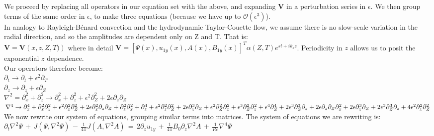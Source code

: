 \documentclass[letterpaper,12pt]{article}
\newcommand\reye{\mathrel{Re}}
\begin{document}
We proceed by replacing all operators in our equation set with the above, and expanding $\mathbf{V}$ in a perturbation series in $\epsilon$. We then group terms of the same order in $\epsilon$, to make three equations (because we have up to $\mathcal{O}(\epsilon^3)$). \\

In analogy to Rayleigh-B\'enard convection and the hydrodynamic Taylor-Couette flow, we assume there is no slow-scale variation in the radial direction, and so the amplitudes are dependent only on Z and T. That is: \\

$\mathbf{V} = \mathbf{V}\left(x, z, Z, T)\right)$ where in detail $\mathbf{V} = \left[\Psi(x), u_{1y}(x), A(x), B_{1y}(x)\right]^T \alpha\left(Z, T\right) e^{st + ik_z z}$. Periodicity in $z$ allows us to posit the exponential $z$ dependence. \\

Our operators therefore become: \\

$\partial_t \to \partial_t + \epsilon^2 \partial_T$ \\

$\partial_z \to \partial_z + \epsilon \partial_Z$ \\

$\nabla^2 = \partial_x^2 + \partial_z^2 \to \partial_x^2  + \partial_z^2 + \epsilon^2 \partial_Z^2 + 2\epsilon\partial_z\partial_Z$ \\

$\nabla^4 \to \partial_x^4 + \partial_x^2\partial_z^2 + \epsilon^2\partial_x^2\partial_Z^2 + 2\epsilon \partial_x^2 \partial_z \partial_Z \\
 + \partial_z^2\partial_x^2 + \partial_z^4 + \epsilon^2\partial_z^2\partial_Z^2 + 2\epsilon\partial_z^3\partial_Z \\
+ \epsilon^2\partial_Z^2\partial_x^2 + \epsilon^3\partial_Z^2\partial_z^2 + \epsilon^4\partial_Z^4 + 2\epsilon^3\partial_Z^3\partial_z \\
+ 2\epsilon\partial_z\partial_Z\partial_x^2 + 2\epsilon\partial_z^3\partial_Z + 2\epsilon^3\partial_Z^3\partial_z + 4\epsilon^2 \partial_z^2 \partial_Z^2$ \\

We now rewrite our system of equations, grouping similar terms into matrices. The system of equations we are rewriting is: \\

$\partial_t \nabla^2 \Psi \, + \, J\left(\Psi, \nabla^2 \Psi\right) \, - \, \frac{1}{4\pi}J\left(A, \nabla^2 A \right) \, =  \, 2 \partial_z u_{1y} \,+ \, \frac{1}{4\pi} B_0 \partial_z \nabla^2 A \, + \, \frac{1}{\reye}\nabla^4 \Psi$ \\
\end{document}
